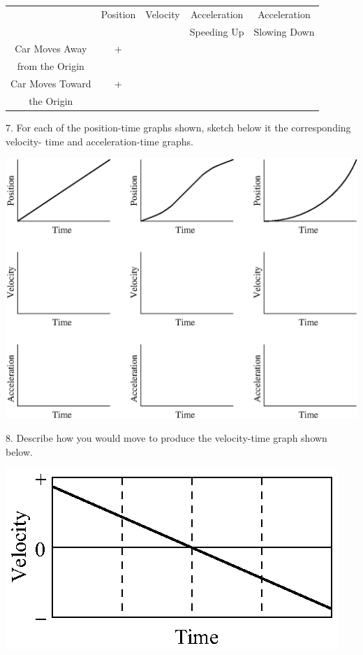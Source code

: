 \vspace{0.3cm}
{\centering \begin{tabular}{|c|c|c|c|c|}
\hline 
&
Position&
Velocity&
Acceleration&
Acceleration\\
&
&
&
Speeding Up&
Slowing Down\\
\hline 
Car Moves Away&
+&
&
&
\\
from the Origin&
&
&
&
\\
\hline 
Car Moves Toward&
+&
&
&
\\
the Origin&
&
&
&
\\
\hline 
\end{tabular}\par}
\vspace{0.3cm}

\newpage

7. For each of the position-time graphs shown, sketch below it the corresponding
velocity- time and acceleration-time graphs.

\vspace{0.3cm}
{\par\centering \includegraphics{slowing/slowing_fig11.eps} \par}
\vspace{0.3cm}

8. Describe how you would move to produce the velocity-time graph shown below.

\vspace{0.3cm}
{\par\raggedright \includegraphics{slowing/slowing_fig12.eps} \par}
\vspace{0.3cm}

